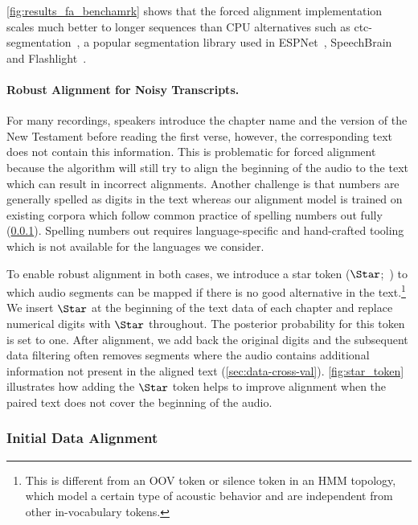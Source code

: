 \insertForceAlignBenchmark

\autoref{fig:results_fa_benchamrk} shows that the forced alignment implementation scales much better to longer sequences than CPU alternatives such as ctc-segmentation~\citep{ctcsegmentation}, a popular segmentation library used in ESPNet~\citep{watanabe2018espnet}, SpeechBrain~\citep{speechbrain} and Flashlight~\citep{kahn2022flashlight}. 
 


\paragraph{Robust Alignment for Noisy Transcripts.}
For many recordings, speakers introduce the chapter name and the version of the New Testament before reading the first verse, however, the corresponding text does not contain this information.
This is problematic for forced alignment because the algorithm will still try to align the beginning of the audio to the text which can result in incorrect alignments.
Another challenge is that numbers are generally spelled as digits in the text whereas our alignment model is trained on existing corpora which follow common practice of spelling numbers out fully (\textsection\ref{sec:data-initial-align}).
Spelling numbers out requires language-specific and hand-crafted tooling which is not available for the \nummmslang{} languages we consider.

\insertStarPlots 

To enable robust alignment in both cases, we introduce a star token ($\Star$;~\citealt{pratap2022star, cai2022wctc}) to which audio segments can be mapped if there is no good alternative in the text.\footnote{This is different from an OOV token or silence token in an HMM topology, which model a certain type of acoustic behavior and are independent from other in-vocabulary tokens.}
We insert $\Star$ at the beginning of the text data of each chapter and replace numerical digits with $\Star$ throughout. 
The posterior probability for this token is set to one.
After alignment, we add back the original digits and the subsequent data filtering often removes segments where the audio contains additional information not present in the aligned text (\textsection\ref{sec:data-cross-val}).
\autoref{fig:star_token} illustrates how adding the $\Star$ token helps to improve alignment when the paired text does not cover the beginning of the audio.



\subsubsection{Initial Data Alignment}
\label{sec:data-initial-align}

